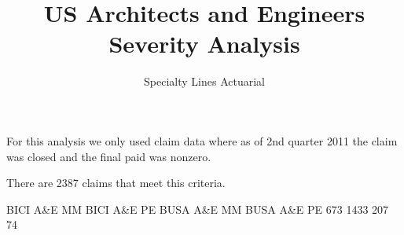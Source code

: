 \documentclass{article}
\title{US Architects and Engineers Severity Analysis}
\author{Specialty Lines Actuarial}
\begin{document}
\maketitle

For this analysis we only used claim data where as of 2nd quarter 2011 the claim was closed
and the final paid was nonzero.

There are 2387 claims that meet this criteria.

\begin{Schunk}
\begin{Soutput}
BICI A&E MM BICI A&E PE BUSA A&E MM BUSA A&E PE 
        673        1433         207          74 
\end{Soutput}
\end{Schunk}

\end{document}
